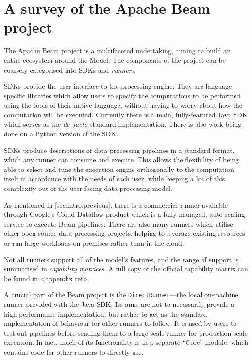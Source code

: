 \section{A survey of the Apache Beam project}\label{sec:prep:beam}

The Apache Beam project is a multifaceted undertaking, aiming to build an entire ecosystem around the Model.
The components of the project can be coarsely categorised into SDKs and \emph{runners}.

SDKs provide the user interface to the processing engine.
They are language-specific libraries which allow users to specify the computations to be performed using the tools of their native language, without having to worry about how the computation will be executed.
Currently there is a main, fully-featured Java SDK which serves as the \emph{de~facto} standard implementation.
There is also work being done on a Python version of the SDK.


SDKs produce descriptions of data processing pipelines in a standard format, which any runner can consume and execute.
This allows the flexibility of being able to select and tune the execution engine orthogonally to the computation itself in accordance with the needs of each user, while keeping a lot of this complexity out of the user-facing data processing model.

As mentioned in \cref{sec:intro:previous}, there is a commercial runner available through Google's Cloud Dataflow product \cite{CloudDataflow} which is a fully-managed, auto-scaling service to execute Beam pipelines.
There are also many runners which utilise other open-source data processing projects, helping to leverage existing resources or run large workloads on-premises rather than in the cloud.

Not all runners support all of the model's features, and the range of support is summarised in \emph{capability matrices}.
A full copy of the official capability matrix can be found in <appendix ref>.



A crucial part of the Beam project is the \verb|DirectRunner|---the local on-machine runner provided with the Java SDK.
Its aims are not to necessarily provide a high-performance implementation, but rather to act as the standard implementation of behaviour for other runners to follow.
It is used by users to test out pipelines before sending them to a large-scale runner for production-scale execution.
In fact, much of its functionality is in a separate ``Core'' module, which contains code for other runners to directly use.

